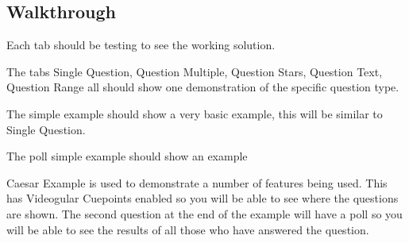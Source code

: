 \documentclass[12pt,a4paper]{article}
\begin{document}
\subsection{Walkthrough}

Each tab should be testing to see the working solution.

The tabs Single Question, Question Multiple, Question Stars, Question Text, Question Range all should show one demonstration of the specific question type.

The simple example should show a very basic example, this will be similar to Single Question.

The poll simple example should show an example 

Caesar Example is used to demonstrate a number of features being used. This has Videogular Cuepoints enabled so you will be able to see where the questions are shown. The second question at the end of the example will have a poll so you will be able to see the results of all those who have answered the question.
\end{document}
